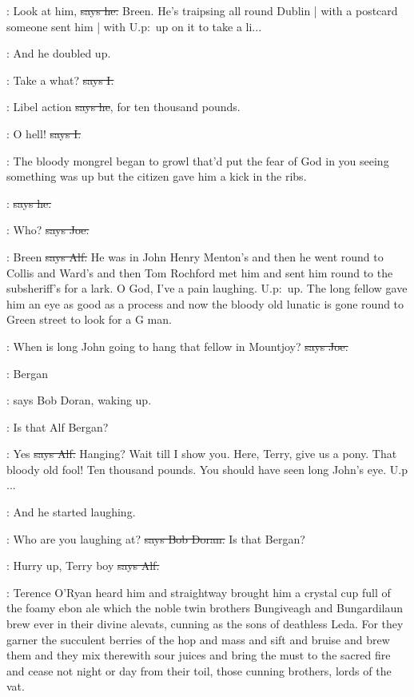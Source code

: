 \bergan:
Look at him,
\sout{says he.}
Breen.
He's traipsing all round Dublin |
with a postcard someone sent him |
with U.p:~up
on it to take a li...

\Nq:
And he doubled up.

:
Take a what?
\sout{says I.}

\bergan:
Libel action
\sout{says he},
for ten thousand pounds.

:
O hell!
\sout{says I.}

\Nq:
The bloody mongrel began to growl that'd put the fear of God in you
seeing something was up but the citizen gave him a kick in the ribs.

\citizen:
\sout{says he.}

\joe:
Who?
\sout{says Joe.}

\bergan:
Breen
\sout{says Alf.}
He was in John Henry Menton's and then he went round
to Collis and Ward's and then Tom Rochford met him and sent him round
to the subsheriff's for a lark.
O God,
I've a pain laughing.
U.p:~up.
The
long fellow gave him an eye as good as a process
and now the bloody old
lunatic is gone round to Green street to look for a G man.

\joe:
When is long John going to hang that fellow in Mountjoy?
\sout{says Joe.}

\doran:
Bergan

\Nq:
says Bob Doran,
waking up.

\doran:
Is that Alf Bergan?

\bergan:
Yes
\sout{says Alf.}
Hanging?
Wait till I show you.
Here,
Terry,
give us a
pony.
That bloody old fool!
Ten thousand pounds.
You should have seen long
John's eye.
U.p ...

\Nq:
And he started laughing.

\doran:
Who are you laughing at?
\sout{says Bob Doran.}
Is that Bergan?

\bergan:
Hurry up,
Terry boy
\sout{says Alf.}

:
Terence O'Ryan heard him
and straightway brought him a crystal
cup full of the foamy ebon ale which the noble twin brothers Bungiveagh
and Bungardilaun brew ever in their divine alevats,
cunning as the sons of
deathless Leda.
For they garner the succulent berries of the hop and mass
and sift and bruise and brew them and they mix therewith sour juices and
bring the must to the sacred fire and cease not night or day from their
toil,
those cunning brothers,
lords of the vat.

